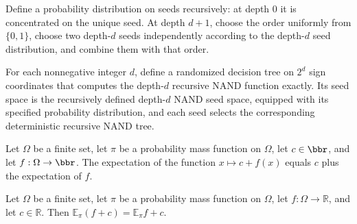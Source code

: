 \begin{definition}
\label{FABL.recursiveNandSeedLaw}
\leanok
{}
Define a probability distribution on seeds recursively: at depth $0$ it is concentrated
on the unique seed. At depth $d+1$, choose the order uniformly from $\{0,1\}$, choose
two depth-$d$ seeds independently according to the depth-$d$ seed distribution, and
combine them with that order.
\end{definition}

\begin{definition}
\label{FABL.recursiveNandRandomizedTree}
\leanok
{}
For each nonnegative integer $d$, define a randomized decision tree on $2^d$ sign
coordinates that computes the depth-$d$ recursive NAND function exactly. Its seed space
is the recursively defined depth-$d$ NAND seed space, equipped with its specified
probability distribution, and each seed selects the corresponding deterministic
recursive NAND tree.
\end{definition}

\begin{theorem}
\label{FABL.pmfExpectation_const_add_general}
\leanok
{}
Let $\Omega$ be a finite set, let $\pi$ be a probability mass function on $\Omega$, let
$c\in\bbr$, and let $f:\Omega\to\bbr$. The expectation of the function $x\mapsto c+f(x)$
equals $c$ plus the expectation of $f$.
\end{theorem}

\begin{theorem}
\label{FABL.pmfExpectation_add_const_general}
\leanok
{}
Let $\Omega$ be a finite set, let $\pi$ be a probability mass function on $\Omega$, let
$f:\Omega\to\mathbb R$, and let $c\in\mathbb R$. Then $\mathbb E_\pi(f+c)=\mathbb E_\pi
f+c$.
\end{theorem}

